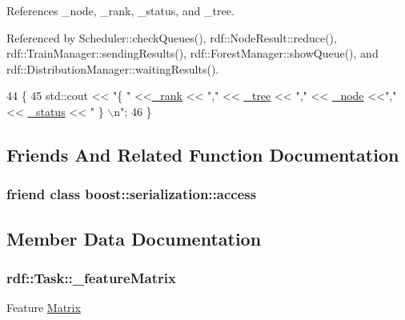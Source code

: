 References \+\_\+node, \+\_\+rank, \+\_\+status, and \+\_\+tree.



Referenced by Scheduler\+::check\+Queues(), rdf\+::\+Node\+Result\+::reduce(), rdf\+::\+Train\+Manager\+::sending\+Results(), rdf\+::\+Forest\+Manager\+::show\+Queue(), and rdf\+::\+Distribution\+Manager\+::waiting\+Results().


\begin{DoxyCode}
44                        \{
45     std::cout << \textcolor{stringliteral}{"\{ "} <<\hyperlink{classrdf_1_1Task_a66806490016907e1acd9ad771811e4d5}{\_rank} <<  \textcolor{stringliteral}{","} << \hyperlink{classrdf_1_1Task_a3986abc1d8a8c79bde8d7525c6faa0bd}{\_tree} << \textcolor{stringliteral}{","} << \hyperlink{classrdf_1_1Task_ab505294f64848a3ee104c9efa45528b5}{\_node} <<\textcolor{stringliteral}{","} <<
      \hyperlink{classrdf_1_1Task_a43face20dfc0d868ef400070d0fd43bb}{\_status} << \textcolor{stringliteral}{" \} \(\backslash\)n"};
46 \}
\end{DoxyCode}


\subsection{Friends And Related Function Documentation}
\subsubsection[{\texorpdfstring{boost\+::serialization\+::access}{boost::serialization::access}}]{\setlength{\rightskip}{0pt plus 5cm}friend class boost\+::serialization\+::access\hspace{0.3cm}{\ttfamily [friend]}}\hypertarget{classrdf_1_1Task_ac98d07dd8f7b70e16ccb9a01abf56b9c}{}\label{classrdf_1_1Task_ac98d07dd8f7b70e16ccb9a01abf56b9c}


\subsection{Member Data Documentation}
\subsubsection[{\texorpdfstring{\+\_\+feature\+Matrix}{_featureMatrix}}]{ rdf\+::\+Task\+::\+\_\+feature\+Matrix\hspace{0.3cm}{\ttfamily [private]}}\hypertarget{classrdf_1_1Task_a05d2cb8251477edc1c869b98a63970fa}{}\label{classrdf_1_1Task_a05d2cb8251477edc1c869b98a63970fa}
Feature \hyperlink{classrdf_1_1Matrix}{Matrix} 

